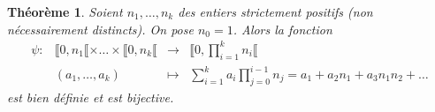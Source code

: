 \documentclass[12pt]{report}
\newtheorem{thm}{Théorème}[chapter]
\begin{document}
\begin{thm}
Soient $n_1,\ldots, n_k$ des entiers strictement positifs (non nécessairement distincts). On pose $n_0=1$. Alors la fonction 
\begin{equation*}
\begin{array}{cccl}
  \psi:  &  \llbracket 0,n_1 \llbracket \times \ldots \times \llbracket 0,n_k \llbracket & \longrightarrow  &  \displaystyle  \Big \llbracket 0, \prod_{i=1}^k n_i \Big   \llbracket\\
         & (a_1, \ldots , a_k) & \longmapsto & \displaystyle \sum_{ i =1}^{ k }a_i \prod_{j=0}^{ i-1}n_j =a_1+a_2n_1+a_3 n_1 n_2+\ldots
\end{array}
\end{equation*}
est bien définie  et est bijective.
\end{thm}
\end{document}
